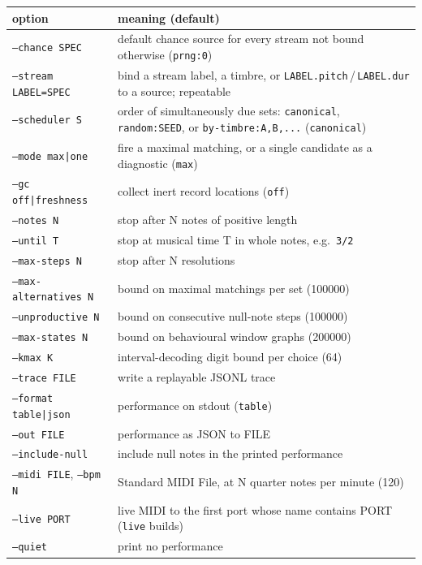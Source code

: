 \documentclass[11pt,a4paper]{article}
\newcommand{\ttx}[1]{\texttt{#1}}
\begin{document}
\begin{center}
\small
\begin{longtable}{@{}l>{\raggedright\arraybackslash}p{9.6cm}@{}}
\toprule
option & meaning (default) \\
\midrule
\endhead
\ttx{--chance SPEC} & default chance source for every stream not bound
  otherwise (\ttx{prng:0}) \\
\ttx{--stream LABEL=SPEC} & bind a stream label, a timbre, or
  \ttx{LABEL.pitch}\,/\,\ttx{LABEL.dur} to a source; repeatable \\
\ttx{--scheduler S} & order of simultaneously due sets: \ttx{canonical},
  \ttx{random:SEED}, or \ttx{by-timbre:A,B,...} (\ttx{canonical}) \\
\ttx{--mode max|one} & fire a maximal matching, or a single candidate as a
  diagnostic (\ttx{max}) \\
\ttx{--gc off|freshness} & collect inert record locations (\ttx{off}) \\
\ttx{--notes N} & stop after N notes of positive length \\
\ttx{--until T} & stop at musical time T in whole notes, e.g.\ \ttx{3/2} \\
\ttx{--max-steps N} & stop after N resolutions \\
\ttx{--max-alternatives N} & bound on maximal matchings per set (100000) \\
\ttx{--unproductive N} & bound on consecutive null-note steps (100000) \\
\ttx{--max-states N} & bound on behavioural window graphs (200000) \\
\ttx{--kmax K} & interval-decoding digit bound per choice (64) \\
\ttx{--trace FILE} & write a replayable JSONL trace \\
\ttx{--format table|json} & performance on stdout (\ttx{table}) \\
\ttx{--out FILE} & performance as JSON to FILE \\
\ttx{--include-null} & include null notes in the printed performance \\
\ttx{--midi FILE}, \ttx{--bpm N} & Standard MIDI File, at N quarter notes per
  minute (120) \\
\ttx{--live PORT} & live MIDI to the first port whose name contains PORT
  (\ttx{live} builds) \\
\ttx{--quiet} & print no performance \\
\bottomrule
\end{longtable}
\end{center}
\end{document}
